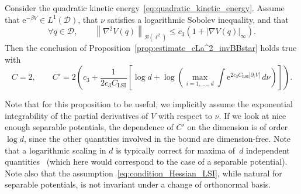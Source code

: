 \documentclass[AHL,Unicode,longabstracts,MathTools,published]{cedram}
\newcommand{\rme}{\mathrm{e}}
\newcommand{\LSI}{\mathrm{LSI}}
\newcommand{\cB}{\mathcal{B}}
\newcommand{\cD}{\mathcal{D}}
\renewcommand{\leq}{\leqslant}
\let\oldforall\forall
\renewcommand*{\forall}{\mathrel{\oldforall}}
\begin{document}
\begin{prop}\label{prop:scaling_dimension_Langevin_improved}
Consider the quadratic kinetic energy~\eqref{eq:quadratic_kinetic_energy}. Assume that $\rme^{-\beta V} \in L^1(\cD)$, that $\nu$ satisfies a logarithmic Sobolev inequality, and that
\begin{equation}\label{eq:condition_Hessian_LSI}
\forall q \in \cD, \qquad \left\|\nabla^2V(q)\right\|_{\cB\left(\ell^2\right)} \leq c_3\left(1 +\left|\nabla V(q)\right|_{\infty}\right).
\end{equation}
Then the conclusion of Proposition~\ref{prop:estimate_cLa^2_invBBstar} holds true with
\[
C = 2, \qquad C' = 2\left(c_3 + \frac{1}{2c_3 C_{\LSI}}\left[\log d + \log\left(\max_{i=1,\,\dots,\,d} \int{\rme^{2c_3 C_{\LSI}\left|\partial_i V\right|} \, d\nu}\right)\right]\right).
\]
\end{prop}

Note that for this proposition to be useful, we implicitly assume the exponential integrability of the partial derivatives of $V$ with respect to $\nu$. If we look at nice enough separable potentials, the dependence of $C'$ on the dimension is of order $\log d$, since the other quantities involved in the bound are dimension-free. Note that a logarithmic scaling in $d$ is typically correct for maxima of~$d$ independent quantities~\cite[Lemma~2.2]{dev2001} (which here would correspond to the case of a separable potential). Note also that the assumption~\eqref{eq:condition_Hessian_LSI}, while natural for separable potentials, is not invariant under a change of orthonormal basis.
\end{document}

